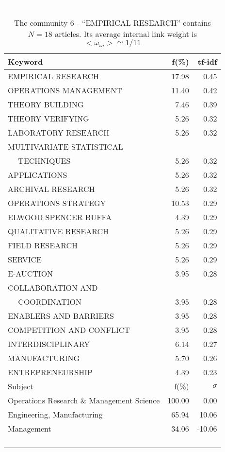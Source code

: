 \documentclass[a4paper,11pt]{report}
\begin{document}
\begin{landscape}
\clearpage

\begin{table}[!ht]
\caption{The community 6 - ``EMPIRICAL RESEARCH'' contains $N = 18$ articles. Its average internal link weight is $<\omega_{in}> \simeq 1/11$ }
\textcolor{white}{aa}\\
{\scriptsize\begin{tabular}{|l r  r|}
\hline
Keyword & f(\%) & tf-idf \\
\hline
EMPIRICAL RESEARCH & 17.98 & 0.45\\
OPERATIONS MANAGEMENT & 11.40 & 0.42\\
THEORY BUILDING & 7.46 & 0.39\\
THEORY VERIFYING & 5.26 & 0.32\\
LABORATORY RESEARCH & 5.26 & 0.32\\
MULTIVARIATE STATISTICAL &  &\\
$\quad$ TECHNIQUES & 5.26 & 0.32\\
APPLICATIONS & 5.26 & 0.32\\
ARCHIVAL RESEARCH & 5.26 & 0.32\\
OPERATIONS STRATEGY & 10.53 & 0.29\\
ELWOOD SPENCER BUFFA & 4.39 & 0.29\\
QUALITATIVE RESEARCH & 5.26 & 0.29\\
FIELD RESEARCH & 5.26 & 0.29\\
SERVICE & 5.26 & 0.29\\
E-AUCTION & 3.95 & 0.28\\
COLLABORATION AND &  &\\
$\quad$ COORDINATION & 3.95 & 0.28\\
ENABLERS AND BARRIERS & 3.95 & 0.28\\
COMPETITION AND CONFLICT & 3.95 & 0.28\\
INTERDISCIPLINARY & 6.14 & 0.27\\
MANUFACTURING & 5.70 & 0.26\\
ENTREPRENEURSHIP & 4.39 & 0.23\\
\hline
\hline
Subject & f(\%) & $\sigma$\\
\hline
Operations Research \& Management Science & 100.00 & 0.00\\
Engineering, Manufacturing & 65.94 & 10.06\\
Management & 34.06 & -10.06\\
 &  & \\
 &  & \\
 &  & \\
 &  & \\

\end{tabular}}
\end{table}
\end{landscape}
\end{document}
